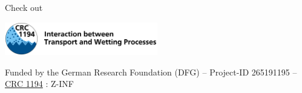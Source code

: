 \begin{frame}{}

    \vfill

    Check out 


    \begin{center}
        \includegraphics[width=0.5\textwidth]{crc-logo}
    \end{center}
    \begin{center}
        Funded by the German Research Foundation (DFG) – Project-ID 265191195 – \href{https://www.sfb1194.tu-darmstadt.de/index.en.jsp}{CRC 1194} : Z-INF
    \end{center}

\end{frame}

